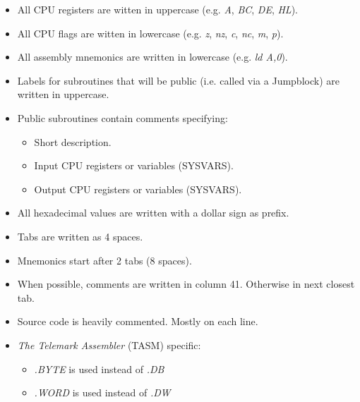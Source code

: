 \documentclass[a4paper,11pt]{article}
\begin{document}
    \begin{itemize}
        \item All CPU registers are witten in uppercase (e.g. \textit{A},
        \textit{BC}, \textit{DE}, \textit{HL}).
        \item All CPU flags are witten in lowercase (e.g. \textit{z},
        \textit{nz}, \textit{c}, \textit{nc}, \textit{m}, \textit{p}).
        \item All assembly mnemonics are written in lowercase (e.g. 
        \textit{ld A,0}).
        \item Labels for subroutines that will be public (i.e. called via a
        Jumpblock) are written in uppercase.
        \item Public subroutines contain comments specifying:
        \begin{itemize}
            \item Short description.
            \item Input CPU registers or variables (SYSVARS).
            \item Output CPU registers or variables (SYSVARS).
        \end{itemize}
        \item All hexadecimal values are written with a dollar sign as prefix.
        \item Tabs are written as 4 spaces.
        \item Mnemonics start after 2 tabs (8 spaces).
        \item When possible, comments are written in column 41. Otherwise in
        next closest tab.
        \item Source code is heavily commented. Mostly on each line.
        \item \textit{The Telemark Assembler} (TASM) specific:
        \begin{itemize}
            \item \textit{.BYTE} is used instead of \textit{.DB}
            \item \textit{.WORD} is used instead of \textit{.DW}
        \end{itemize}
    \end{itemize}

    \pagebreak
    
    
\end{document}
